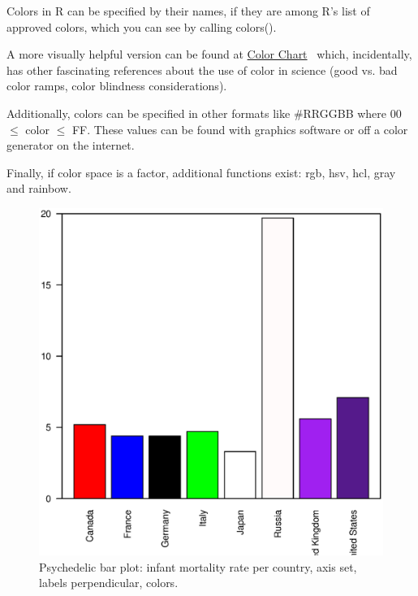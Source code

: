 \documentclass{report}
\newcommand{\code}[1]{\textsf{\ttfamily #1}}
\begin{document}
\begin{tcolorbox}[title=Colors in R, parbox=false]
Colors in R can be specified by their names, if they are among R's list of approved colors, which you can see by calling \code{colors()}.

A more visually helpful version can be found at \href{http://research.stowers.org/mcm/efg/R/Color/Chart/}{Color Chart}~\cite{rcolors} which, incidentally, has other fascinating references about the use of color in science (good vs. bad color ramps, color blindness considerations).

Additionally, colors can be specified in other formats like \code{\#RRGGBB} where 00 $\leq$ color $\leq$ FF. These values can be found with graphics software or off a color generator on the internet.

Finally, if color space is a factor, additional functions exist: \code{rgb}, \code{hsv}, \code{hcl}, \code{gray} and \code{rainbow}.
\end{tcolorbox}

\begin{figure}[h]
	\centering
	\includegraphics[width=1.0\textwidth]{barpsych.eps}
	\caption{Psychedelic bar plot: infant mortality rate per country, axis set, labels perpendicular, colors.}
\label{fig:barpsych}
\end{figure}
\end{document}
